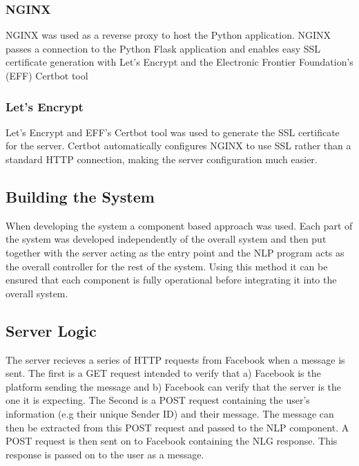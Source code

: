 \documentclass[12pt,a4paper]{article}
\begin{document}
    \subsubsection{NGINX}
    NGINX was used as a reverse proxy to host the Python application. NGINX passes a connection to the Python Flask application and enables easy SSL certificate generation with Let's Encrypt and the Electronic Frontier Foundation's (EFF) Certbot tool %
    
    \subsubsection{Let's Encrypt}
    Let's Encrypt and EFF's Certbot tool was used to generate the SSL certificate for the server. Certbot automatically configures NGINX to use SSL rather than a standard HTTP connection, making the server configuration much easier.
    
    \subsection{Building the System}
    When developing the system a component based approach was used. Each part of the system was developed independently of the overall system and then put together with the server acting as the entry point and the NLP program acts as the overall controller for the rest of the system. Using this method it can be ensured that each component is fully operational before integrating it into the overall system.
    
    \subsection{Server Logic}
    The server recieves a series of HTTP requests from Facebook when a message is sent. The first is a GET request intended to verify that a) Facebook is the platform sending the message and b) Facebook can verify that the server is the one it is expecting. The Second is a POST request containing the user's information (e.g their unique Sender ID) and their message. The message can then be extracted from this POST request and passed to the NLP component. A POST request is then sent on to Facebook containing the NLG response. This response is passed on to the user as a message.
    
\end{document}
